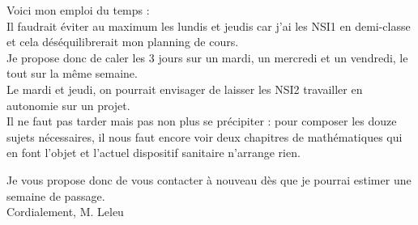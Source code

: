 \documentclass[a4paper,12pt,french]{book}
\begin{document}
Voici mon emploi du temps :\\


Il faudrait éviter au maximum les lundis et jeudis car j'ai les \textsc{NSI1} en demi-classe et cela déséquilibrerait mon planning de cours.\\
Je propose donc de caler les 3 jours sur un mardi, un mercredi et un vendredi, le tout sur la même semaine.\\
Le mardi et jeudi, on pourrait envisager de laisser les \textsc{NSI2} travailler en autonomie sur un projet.\\

Il ne faut pas tarder mais pas non plus se précipiter : pour composer les douze sujets nécessaires, il nous faut encore voir deux chapitres de mathématiques qui en font l'objet et l'actuel dispositif sanitaire n'arrange rien.

Je vous propose donc de vous contacter à nouveau dès que je pourrai estimer une semaine de passage.\\


Cordialement,
M. Leleu
\end{document}
